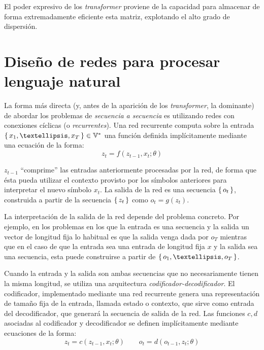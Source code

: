 El poder expresivo de los \textit{transformer} proviene de la capacidad para almacenar de forma extremadamente eficiente esta matriz, explotando el alto grado de dispersión. 

\section{Diseño de redes para procesar lenguaje natural}
La forma más directa (y, antes de la aparición de los \textit{transformer}, la dominante) de abordar los problemas de \textit{secuencia a secuencia} es utilizando redes con conexiones cíclicas (o \textit{recurrentes}). Una red recurrente computa sobre la entrada \( \Set{ x_{1}, …, x_T } \in \mathbb{V}^* \) una función definida implícitamente mediante una ecuación de la forma:
\begin{equation} \label{eq:rnn}
    z_{t} = f(z_{t-1}, x_{t}; \theta)
\end{equation}

\( z_{t-1} \) ``comprime'' las entradas anteriormente procesadas por la red, de forma que ésta pueda utilizar el contexto provisto por los símbolos anteriores para interpretar el nuevo símbolo \( x_{t} \). La salida de la red es una secuencia \( \{\,o_{t}\,\} \), construida a partir de la secuencia \( \{\,z_t\,\} \) como \( o_{t} = g(z_t) \).

La interpretación de la salida de la red depende del problema concreto. Por ejemplo, en los problemas en los que la entrada es una secuencia y la salida un vector de longitud fija lo habitual es que la salida venga dada por \( o_{T} \) mientras que en el caso de que la entrada sea una entrada de longitud fija \( x \) y la salida sea una secuencia, esta puede construirse a partir de \( \Set{ o_{1}, …, o_{T} } \).

Cuando la entrada y la salida son ambas secuencias que no necesariamente tienen la misma longitud, se utiliza una arquitectura \textit{codificador-decodificador}. El codificador, implementado mediante una red recurrente genera una representación de tamaño fija de la entrada, llamada estado o contexto, que sirve como entrada del decodificador, que generará la secuencia de salida de la red. Las funciones \( c, d \) asociadas al codificador y decodificador se definen implícitamente mediante ecuaciones de la forma:
\begin{equation} \label{eq:encoder}
    z_{t} = c(z_{t-1}, x_{t}; \theta) \qquad o_{t} = d(o_{t-1}, z_{t}; \theta)
\end{equation}

